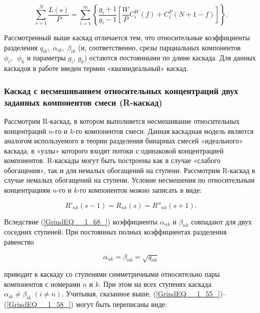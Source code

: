 \begin{equation} \label{GrindEQ__1_62_} 
  \sum _{s=1}^{N}\frac{L(s)}{P} =\sum _{i=1}^{m}\left\{\frac{g_{i} +1}{g_{i} -1} \left[\frac{W}{P} C_{i}^{W} (f)+C_{i}^{P} \left(N+1-f\right)\right]\right\}  .   
\end{equation} 
  

Рассмотренный выше каскад отличается тем, что относительные коэффициенты разделения $q_{ik} ,\; \alpha _{ik} ,\; \beta _{ik} $ (и, соответственно, срезы парциальных компонентов $\phi _{i} ,\; \; \phi _{k} $ и параметры $g_{i} $, $g_{k} $) остаются постоянными по длине каскада. Для данных каскадов в работе \cite{sazykinKvaziidealnyeKaskadyDlya2000} введен термин «квазиидеальный» каскад.

\subsubsection{Каскад с несмешиванием относительных концентраций двух заданных компонентов смеси (R-каскад)}

Рассмотрим R-каскад, в котором выполняется несмешивание относительных концентраций $n$-го и $k$-го компонентов смеси. Данная каскадная модель является аналогом используемого в теории разделения бинарных смесей «идеального» каскада, в «узлы» которого входят потоки с одинаковой концентрацией компонентов. R-каскады могут быть построены как в случае «слабого обогащения», так и для немалых обогащений на ступени. Рассмотрим R-каскад в случае немалых обогащений на ступени. Условие несмешения по относительным концентрациям $n$-го и $k$-го компонентов можно записать в виде:

\begin{equation} \label{GrindEQ__1_68_} 
  R'_{nk} (s-1)=R_{nk} (s)=R''_{nk} (s+1).                                                 
\end{equation} 

Вследствие (\ref{GrindEQ__1_68_}) коэффициенты $\alpha _{nk} $ и $\beta _{nk} $ совпадают для двух соседних ступеней. При постоянных полных коэффициентах разделения равенство

\begin{equation} \label{GrindEQ__1_69_} 
  \alpha _{nk} =\beta _{nk} =\sqrt{q_{nk} }  
\end{equation} 

приводит к каскаду со ступенями симметричными относительно пары компонентов с номерами $n$ и $k$. При этом на всех ступенях каскада $\alpha _{ik} \ne \beta _{ik} \; (i\ne n)$. Учитывая, сказанное выше, (\ref{GrindEQ__1_55_})--(\ref{GrindEQ__1_58_}) могут быть переписаны виде:
  


